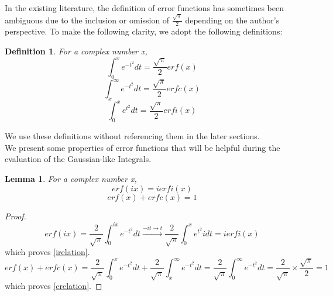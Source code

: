 \documentclass[a4paper,twoside,10pt]{article}
\newtheorem{lemma}{Lemma}[theorem]
\newtheorem{definition}{Definition}
\begin{document}
In the existing literature, the definition of error functions has sometimes been ambiguous due to the inclusion or omission of   $\frac{\sqrt{\pi}}{2}  $ depending on the author's perspective\cite{EG1969}. To make the following clarity, we adopt the following definitions:
\begin{definition}
 
For a complex number x,
\begin{equation}\label{erf}
 \int_0^x e^{-t^2} dt = \frac{\sqrt{\pi}}{2}erf(x) 
\end{equation}
\begin{equation}\label{erfc}
 \int_x^{\infty} e^{-t^2} dt = \frac{\sqrt{\pi}}{2} erfc(x) 
\end{equation}
\begin{equation}\label{erfi} 
 \int_0^x e^{t^2} dt = \frac{\sqrt{\pi}}{2} erfi(x)  
\end{equation}
\end{definition}

We use these definitions without referencing them in the later sections. \\

We present some properties of error functions that will be helpful during the evaluation of the Gaussian-like Integrals. 
\begin{lemma}
For a complex number x,
\begin{equation}\label{irelation}
 erf(ix)=ierfi(x) 
\end{equation}
\begin{equation}\label{crelation}
 erf(x)+erfc(x)=1 
\end{equation}
\end{lemma}
\begin{proof}
\[ erf(ix) =\frac{2}{\sqrt{\pi}} \int_0^{ix} e^{-t^2} dt \xrightarrow{-it\rightarrow t}  \frac{2}{\sqrt{\pi}} \int_0^x e^{t^2} i dt  = ierfi(x)  \] which proves \eqref{irelation}. 
\[ erf(x)+erfc(x) =  \frac{2}{\sqrt{\pi}} \int_0^{x} e^{-t^2} dt +\frac{2}{\sqrt{\pi}} \int_x^{\infty} e^{-t^2} dt = \frac{2}{\sqrt{\pi}} \int_0^{\infty} e^{-t^2} dt = \frac{2}{\sqrt{\pi}} \times \frac{\sqrt{\pi}}{2} = 1    \]
which proves \eqref{crelation}. 
\end{proof}
\end{document}
